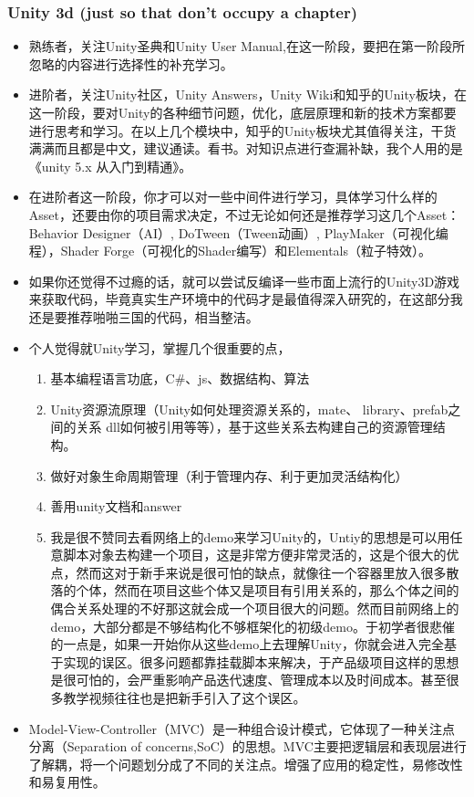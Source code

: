 \documentclass[9pt, b5paper]{article}
\begin{document}
\subsubsection{Unity 3d (just so that don't occupy a chapter)}
\label{sec:org76f0afa}
\begin{itemize}
\item 熟练者，关注Unity圣典和Unity User Manual,在这一阶段，要把在第一阶段所忽略的内容进行选择性的补充学习。
\item 进阶者，关注Unity社区，Unity Answers，Unity Wiki和知乎的Unity板块，在这一阶段，要对Unity的各种细节问题，优化，底层原理和新的技术方案都要进行思考和学习。在以上几个模块中，知乎的Unity板块尤其值得关注，干货满满而且都是中文，建议通读。看书。对知识点进行查漏补缺，我个人用的是《unity 5.x 从入门到精通》。
\item 在进阶者这一阶段，你才可以对一些中间件进行学习，具体学习什么样的Asset，还要由你的项目需求决定，不过无论如何还是推荐学习这几个Asset：Behavior Designer（AI）, DoTween（Tween动画）, PlayMaker（可视化编程），Shader Forge（可视化的Shader编写）和Elementals（粒子特效）。
\item 如果你还觉得不过瘾的话，就可以尝试反编译一些市面上流行的Unity3D游戏来获取代码，毕竟真实生产环境中的代码才是最值得深入研究的，在这部分我还是要推荐啪啪三国的代码，相当整洁。
\item 个人觉得就Unity学习，掌握几个很重要的点，
\begin{enumerate}
\item 基本编程语言功底，C\#、js、数据结构、算法
\item Unity资源流原理（Unity如何处理资源关系的，mate、 library、prefab之间的关系 dll如何被引用等等），基于这些关系去构建自己的资源管理结构。
\item 做好对象生命周期管理（利于管理内存、利于更加灵活结构化）
\item 善用unity文档和answer
\item 我是很不赞同去看网络上的demo来学习Unity的，Untiy的思想是可以用任意脚本对象去构建一个项目，这是非常方便非常灵活的，这是个很大的优点，然而这对于新手来说是很可怕的缺点，就像往一个容器里放入很多散落的个体，然而在项目这些个体又是项目有引用关系的，那么个体之间的偶合关系处理的不好那这就会成一个项目很大的问题。然而目前网络上的demo，大部分都是不够结构化不够框架化的初级demo。于初学者很悲催的一点是，如果一开始你从这些demo上去理解Unity，你就会进入完全基于实现的误区。很多问题都靠挂载脚本来解决，于产品级项目这样的思想是很可怕的，会严重影响产品迭代速度、管理成本以及时间成本。甚至很多教学视频往往也是把新手引入了这个误区。
\end{enumerate}
\item Model-View-Controller（MVC）是一种组合设计模式，它体现了一种关注点分离（Separation of concerns,SoC）的思想。MVC主要把逻辑层和表现层进行了解耦，将一个问题划分成了不同的关注点。增强了应用的稳定性，易修改性和易复用性。
\end{itemize}
\end{document}
